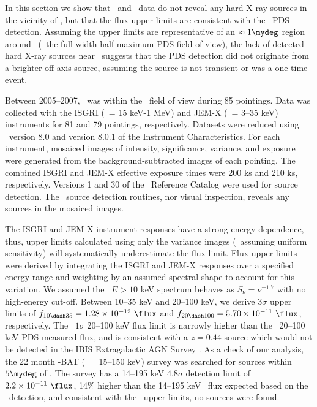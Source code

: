 \documentclass[useAMS,usenatbib]{mn2e}
\begin{document}
\subsubsection{\integral}

In this section we show that \integral\ and \swift\ data do not reveal
any hard X-ray sources in the vicinity of \irs, but that the flux
upper limits are consistent with the \bepposax\ PDS
detection. Assuming the upper limits are representative of an $\approx
1\mydeg$ region around \irs\ (\ie\ the full-width half maximum PDS
field of view), the lack of detected hard X-ray sources near
\irs\ suggests that the PDS detection did not originate from a
brighter off-axis source, assuming the source is not transient or was
a one-time event.

Between 2005--2007, \irs\ was within the \integral\ field of view
during 85 pointings. Data was collected with the ISGRI (\esens\ = 15
keV-1 MeV) and JEM-X (\esens\ = 3--35 keV) instruments for 81 and 79
pointings, respectively. Datasets were reduced using \osa\ version 8.0
and version 8.0.1 of the Instrument Characteristics. For each
instrument, mosaiced images of intensity, significance, variance, and
exposure were generated from the background-subtracted images of each
pointing. The combined ISGRI and JEM-X effective exposure times were
200 ks and 210 ks, respectively. Versions 1 and 30 of the
\integral\ Reference Catalog were used for source detection. The
\osa\ source detection routines, nor visual inspection, reveals any
sources in the mosaiced images.

The ISGRI and JEM-X instrument responses have a strong energy
dependence, thus, upper limits calculated using only the variance
images (\ie\ assuming uniform sensitivity) will systematically
underestimate the flux limit. Flux upper limits were derived by
integrating the ISGRI and JEM-X responses over a specified energy
range and weighting by an assumed spectral shape to account for this
variation. We assumed the \irs\ $E> 10$ keV spectrum behaves as
$S_{\nu} = \nu^{-1.7}$ with no high-energy cut-off. Between 10--35 keV
and 20--100 keV, we derive $3\sigma$ upper limits of $f_{10 \dash 35}
= 1.28 \times 10^{-12} ~\flux$ and $f_{20 \dash 100} = 5.70 \times
10^{-11} ~\flux$, respectively. The \integral\ $1\sigma$ 20--100 keV
flux limit is narrowly higher than the \bepposax\ 20--100 keV PDS
measured flux, and is consistent with a $z = 0.44$ source which would
not be detected in the IBIS Extragalactic AGN Survey
\citep{2006ApJ...636L..65B}. As a check of our analysis, the 22 month
\swift-BAT (\esens\ = 15--150 keV) survey \citep{2010ApJS..186..378T}
was searched for sources within $5\mydeg$ of \irs. The survey has a
14--195 keV $4.8\sigma$ detection limit of $2.2 \times 10^{-11}
~\flux$, 14\% higher than the 14--195 keV \irs\ flux expected based on
the \bepposax\ detection, and consistent with the \integral\ upper
limits, no sources were found.
\end{document}
